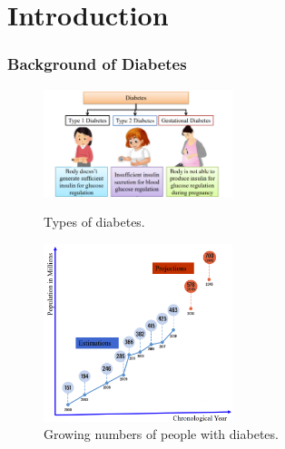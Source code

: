 \documentclass[fontsize=11pt,aspectratio=169,t,fleqn]{beamer}
\begin{document}
\section{Introduction}
\begin{frame}
    \frametitle{Background of Diabetes}
    \begin{figure}[h!]
        \begin{minipage}[b]{0.45\linewidth}
            \centering
            \includegraphics[width=55mm,scale=1.5]{fig/diabetes.png}
            \caption{Types of diabetes.}
            \label{fig:diabetes}
        \end{minipage}
        \hspace{0.5cm}
        \begin{minipage}[b]{0.45\linewidth}
            \centering
            \includegraphics[width=55mm,scale=1.5]{fig/numbers_diabetes.png}
            \caption{Growing numbers of people with diabetes.}
            \label{fig:numbers_diabetes}
        \end{minipage}
    \end{figure}
\end{frame}
\end{document}
